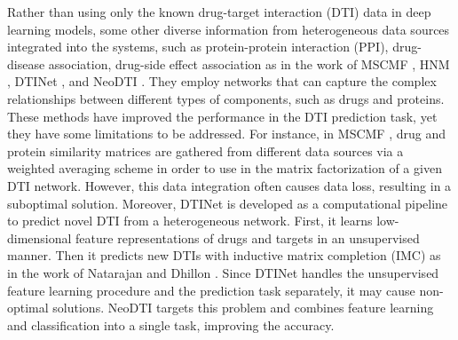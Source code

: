 Rather than using only the known drug-target interaction (DTI) data in deep learning models, some other diverse information from heterogeneous data sources integrated into the systems, such as protein-protein interaction (PPI), drug-disease association, drug-side effect association as in the work of MSCMF \cite{zheng2013collaborative}, HNM \cite{wang2014drug}, DTINet \cite{luo2017network}, and NeoDTI \cite{wan2018neodti}. They employ networks that can capture the complex relationships between different types of components, such as drugs and proteins. These methods have improved the performance in the DTI prediction task, yet they have some limitations to be addressed. For instance, in MSCMF \cite{zheng2013collaborative}, drug and protein similarity matrices are gathered from different data sources via a weighted averaging scheme in order to use in the matrix factorization of a given DTI network. However, this data integration often causes data loss, resulting in a suboptimal solution. Moreover, DTINet \cite{luo2017network} is developed as a computational pipeline to predict novel DTI from a heterogeneous network. First, it learns low-dimensional feature representations of drugs and targets in an unsupervised manner. Then it predicts new DTIs with inductive matrix completion (IMC) as in the work of Natarajan and Dhillon \cite{natarajan2014inductive}. Since DTINet handles the unsupervised feature learning procedure and the prediction task separately, it may cause non-optimal solutions. NeoDTI \cite{wan2018neodti} targets this problem and combines feature learning and classification into a single task, improving the accuracy. 

